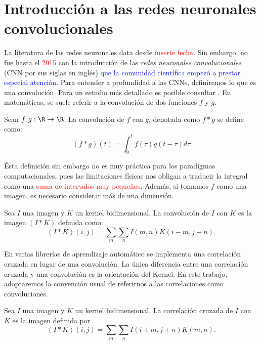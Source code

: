     \chapter{Introducción a las redes neuronales convolucionales}
    La literatura de las redes neuronales data desde \textcolor{red}{inserte fecha}. Sin embargo, no fue hasta el \textcolor{red}{2015} con la introducción de las \textsl{redes neuronales convolucionales} (CNN por sus siglas en inglés) \textcolor{blue}{que la comunidad científica empezó a prestar especial atención}. Para entender a profundidad a las CNNs, definiremos lo que es una convolución. Para un estudio más detallado es posible consultar \cite{CNNdefinition,deeplearningbook}. En matemáticas, se suele referir a la convolución de dos funciones $f$ y $g$.
    \begin{definition}[Convolución]
        Sean $f,g : \R \to \R$. La convolución de $f$ con $g$, denotada como $f * g$ se define como:
        $$(f*g)(t) = \int_{0}^t f(\tau)g(t-\tau)d\tau$$
    \end{definition}
    Ésta definición sin embargo no es muy práctica para los paradigmas computacionales, pues  las limitaciones físicas nos obligan a traducir la integral como una \textcolor{red}{suma de intervalos muy pequeños}. Además, si tomamos $f$ como una imagen, es necesario considerar más de una dimensión.
    \begin{definition}
        Sea $I$ una imagen y $K$ un kernel bidimensional. La convolución de $I$ con $K$ es la imagen $(I*K)$ definida como:
        $$(I*K)(i,j) = \sum_m\sum_n I(m,n)K(i-m,j-n).$$ 
    \end{definition}
    En varias librerías de aprendizaje automático se implementa una correlación cruzada en lugar de una convolución. La única diferencia entre una correlación cruzada y una convolución es la orientación del Kernel. En este trabajo, adoptaremos la convención usual de referirnos a las correlaciones como convoluciones.
    \begin{definition}
        Sea $I$ una imagen y $K$ un kernel bidimensional. La correlación cruzada de $I$ con $K$ es la imagen definida por 
        $$(I*K)(i,j) = \sum_m\sum_n I(i+m,j+n)K(m,n).$$ 
    \end{definition} 

